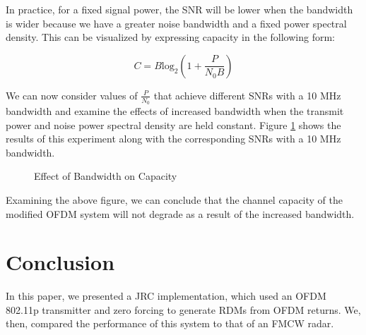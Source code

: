 \documentclass[conference]{IEEEtran}
\begin{document}
In practice, for a fixed signal power, the SNR will be lower when the bandwidth is wider because we have a greater noise bandwidth and a fixed power spectral density. This can be visualized by expressing capacity in the following form:

\begin{equation}
	C = B\text{log}_2\left(1 + \frac{P}{{N_0}B} \right)
\end{equation}

We can now consider values of $\frac{P}{N_0}$ that achieve different SNRs with a 10 MHz bandwidth and examine the effects of increased bandwidth when the transmit power and noise power spectral density are held constant. Figure \ref{fig::capacity_vs_bandwidth} shows the results of this experiment along with the corresponding SNRs with a 10 MHz bandwidth.

\begin{figure}[H]
\centering
{}
\caption{Effect of Bandwidth on Capacity}
\label{fig::capacity_vs_bandwidth}
\end{figure}

Examining the above figure, we can conclude that the channel capacity of the modified OFDM system will not degrade as a result of the increased bandwidth.  

\section {Conclusion}

In this paper, we presented a JRC implementation, which used an OFDM 802.11p transmitter and zero forcing to generate RDMs from OFDM returns. We, then, compared the performance of this system to that of an FMCW radar.
\end{document}
